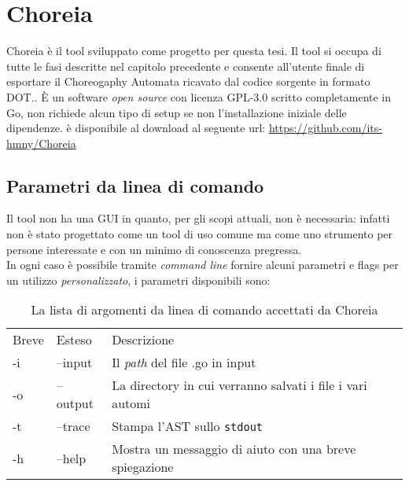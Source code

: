\chapter{Choreia}
Choreia è il tool sviluppato come progetto per questa tesi. Il tool si occupa di tutte le fasi descritte nel capitolo precedente e consente all'utente finale di esportare il Choreogaphy Automata ricavato dal codice sorgente in formato DOT.. È un software \emph{open source} con licenza GPL-3.0 scritto completamente in Go, non richiede alcun tipo di setup se non l'installazione iniziale delle dipendenze. è disponibile al download al seguente url: \url{https://github.com/its-hmny/Choreia}\\

\section{Parametri da linea di comando}
Il tool non ha una GUI in quanto, per gli scopi attuali, non è necessaria: infatti non è stato progettato come un tool di uso comune ma come uno strumento per persone interessate e con un minimo di conoscenza pregressa.\\
In ogni caso è possibile tramite \emph{command line} fornire alcuni parametri e flags per un utilizzo \emph{personalizzato}, i parametri disponibili sono:
\begin{table}[h!]
    \centering
    \begin{tabular}{l l l}
        Breve & Esteso   & Descrizione                                               \\
        -i    & --input  & Il \emph{path} del file .go in input                      \\
        -o    & --output & La directory in cui verranno salvati i file i vari automi \\
        -t    & --trace  & Stampa l'AST sullo \texttt{stdout}                        \\
        -h    & --help   & Mostra un messaggio di aiuto con una breve spiegazione    \\
    \end{tabular}
    \caption{La lista di argomenti da linea di comando  accettati da Choreia}
\end{table}

